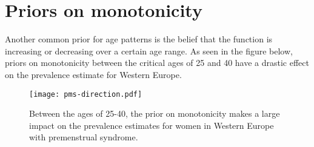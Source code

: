 \section{Priors on monotonicity}
Another common prior for age patterns is the belief that the function is increasing or decreasing over a certain age range.  As seen in the figure below, priors on monotonicity between the critical ages of 25 and 40 have a drastic effect on the prevalence estimate for Western Europe. 
   
    \begin{figure}
        \begin{center}
            \texttt{[image: pms-direction.pdf]}
        \end{center}
        \caption{Between the ages of 25-40, the prior on monotonicity makes a large impact on the prevalence estimates for women in Western Europe with premenstrual syndrome.}
        \label{fig:app-knot_loc}
    \end{figure}